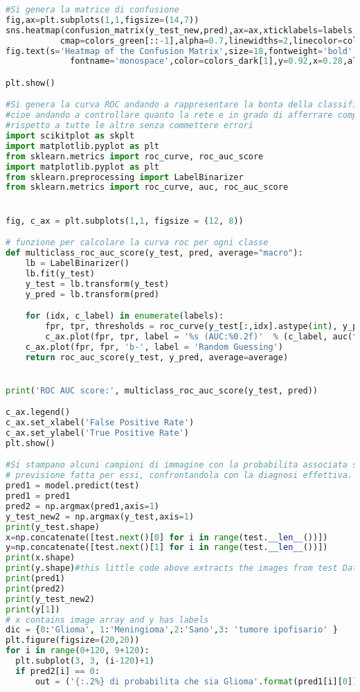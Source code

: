 \begin{lstlisting}[basicstyle=\tiny, language=Python, caption=Esempio di implementazione di AlexNet per la classificazione di RM con l'aggiunta di rumore al set di training.~\cite{dsbrain} ]
#Si genera la matrice di confusione
fig,ax=plt.subplots(1,1,figsize=(14,7))
sns.heatmap(confusion_matrix(y_test_new,pred),ax=ax,xticklabels=labels,yticklabels=labels,annot=True,
           cmap=colors_green[::-1],alpha=0.7,linewidths=2,linecolor=colors_dark[3])
fig.text(s='Heatmap of the Confusion Matrix',size=18,fontweight='bold',
             fontname='monospace',color=colors_dark[1],y=0.92,x=0.28,alpha=0.8)

plt.show()

#Si genera la curva ROC andando a rappresentare la bonta della classificazione con la tecnica One vs. All
#cioe andando a controllare quanto la rete e in grado di afferrare completamente nuovi esempi per quella classe
#rispetto a tutte le altre senza commettere errori
import scikitplot as skplt
import matplotlib.pyplot as plt
from sklearn.metrics import roc_curve, roc_auc_score
import matplotlib.pyplot as plt 
from sklearn.preprocessing import LabelBinarizer
from sklearn.metrics import roc_curve, auc, roc_auc_score


fig, c_ax = plt.subplots(1,1, figsize = (12, 8))

# funzione per calcolare la curva roc per ogni classe
def multiclass_roc_auc_score(y_test, pred, average="macro"):
    lb = LabelBinarizer()
    lb.fit(y_test)
    y_test = lb.transform(y_test)
    y_pred = lb.transform(pred)

    for (idx, c_label) in enumerate(labels):
        fpr, tpr, thresholds = roc_curve(y_test[:,idx].astype(int), y_pred[:,idx])
        c_ax.plot(fpr, tpr, label = '%s (AUC:%0.2f)'  % (c_label, auc(fpr, tpr)))
    c_ax.plot(fpr, fpr, 'b-', label = 'Random Guessing')
    return roc_auc_score(y_test, y_pred, average=average)


print('ROC AUC score:', multiclass_roc_auc_score(y_test, pred))

c_ax.legend()
c_ax.set_xlabel('False Positive Rate')
c_ax.set_ylabel('True Positive Rate')
plt.show()

#Si stampano alcuni campioni di immagine con la probabilita associata sulla
# previsione fatta per essi, confrontandola con la diagnosi effettiva.
pred1 = model.predict(test)
pred1 = pred1
pred2 = np.argmax(pred1,axis=1)
y_test_new2 = np.argmax(y_test,axis=1)
print(y_test.shape)
x=np.concatenate([test.next()[0] for i in range(test.__len__())])
y=np.concatenate([test.next()[1] for i in range(test.__len__())])
print(x.shape)
print(y.shape)#this little code above extracts the images from test Data iterator without shuffling the sequence
print(pred1)
print(pred2)
print(y_test_new2)
print(y[1])
# x contains image array and y has labels 
dic = {0:'Glioma', 1:'Meningioma',2:'Sano',3: 'tumore ipofisario' }
plt.figure(figsize=(20,20))
for i in range(0+120, 9+120):
  plt.subplot(3, 3, (i-120)+1)
  if pred2[i] == 0: 
      out = ('{:.2%} di probabilita che sia Glioma'.format(pred1[i][0]))
      

\end{lstlisting}
